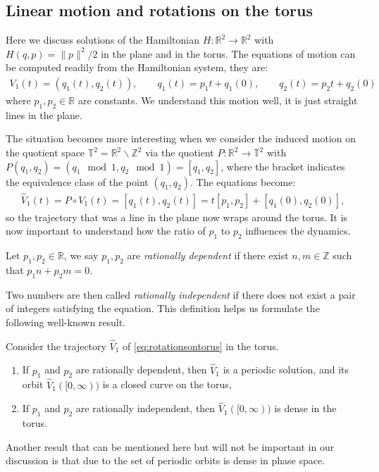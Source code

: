 \subsection{Linear motion and rotations on the torus}

Here we discuss solutions of the Hamiltonian $H:\mathbb R^2\to\mathbb R^2$ with $H(q,p)= \|p\|^2/2$ in the plane and in the torus. The equations of motion can be computed readily from the Hamiltonian system, they are:
\begin{align}\label{eq:linearmotion}
V_1(t) = (q_1(t),q_2(t)),\qquad
q_1(t) = p_1t+q_1(0),\qquad
q_2(t) = p_2t+q_2(0)
\end{align}
where $p_1,p_2\in\mathbb R$ are constants. We understand this motion well, it is just straight lines in the plane.

The situation becomes more interesting when we consider the induced motion on the quotient space $\mathbb T^2=\mathbb R^2\backslash \mathbb Z^2$ via the quotient $P:\mathbb R^2\to\mathbb T^2$ with $P(q_1,q_2) = (q_1\!\!\mod 1,q_2\!\!\mod 1) = [q_1,q_2]$, where the bracket indicates the equivalence class of the point $(q_1,q_2)$. The equations become:
\begin{align}\label{eq:rotationsontorus}
\hat V_1(t) = P\circ V_1(t) = [q_1(t),q_2(t)] = t[p_1,p_2] + [q_1(0),q_2(0)],
\end{align}
so the trajectory that was a line in the plane now wraps around the torus. It is now important to understand how the ratio of $p_1$ to $p_2$ influences the dynamics. 

\begin{definition}
Let $p_1,p_2\in\mathbb R$, we say $p_1,p_2$ are \textit{rationally dependent} if there exist $n,m\in\mathbb Z$ such that $p_1n+p_2m=0$.
\end{definition}

Two numbers are then called \textit{rationally independent} if there does not exist a pair of integers satisfying the equation. This definition helps us formulate the following well-known result.

\begin{proposition}\label{prop:rotationsontorus}
Consider the trajectory $\hat V_1$ of \eqref{eq:rotationsontorus} in the torus.
\begin{enumerate}
\item If $p_1$ and $p_2$ are rationally dependent, then $\hat V_1$ is a periodic solution, and its orbit $\hat V_1([0,\infty))$ is a closed curve on the torus,
\item If $p_1$ and $p_2$ are rationally independent, then $\hat V_1([0,\infty))$ is dense in the torus.
\end{enumerate}
\end{proposition}

Another result that can be mentioned here but will not be important in our discussion is that due to  the set of periodic orbits is dense in phase space.

